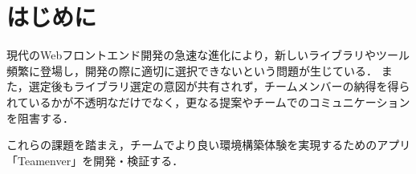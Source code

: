\documentclass[main]{subfiles}
\begin{document}
\section{はじめに }
現代のWebフロントエンド開発の急速な進化により，新しいライブラリやツール頻繁に登場し，開発の際に適切に選択できないという問題が生じている\cite{medium.com}．
また，選定後もライブラリ選定の意図が共有されず，チームメンバーの納得を得られているかが不透明なだけでなく，更なる提案やチームでのコミュニケーションを阻害する．

これらの課題を踏まえ，チームでより良い環境構築体験を実現するためのアプリ「Teamenver」を開発・検証する．
\end{document}
